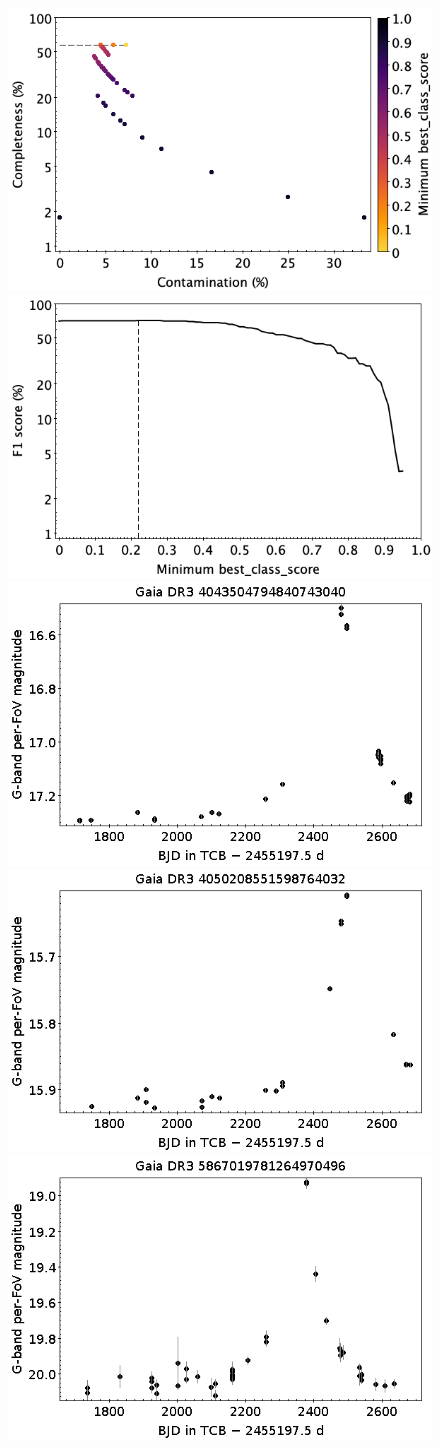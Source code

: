 \documentclass[longauth]{aa}
\begin{document}
\begin{appendix}
\begin{figure}
\centering
{} \includegraphics[width=0.45\hsize]{figures/appendix/MICROLENSING_cls_scc.png}   
\hspace{2mm}
 \includegraphics[width=0.45\hsize]{figures/appendix/MICROLENSING_cls_sf1.png} \\  
\vspace{4mm}
 \includegraphics[width=0.45\hsize]{figures/appendix/MICROLENSING-17.png}  
\hspace{2mm}
 \includegraphics[width=0.45\hsize]{figures/appendix/MICROLENSING-25.png} \\
\vspace{4mm}
 \includegraphics[width=0.45\hsize]{figures/appendix/MICROLENSING-62.png}  

\end{figure}
\end{appendix}
\end{document}
